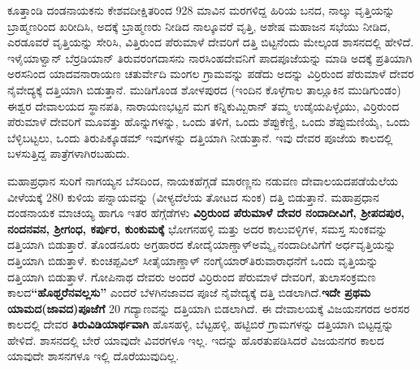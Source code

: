 ಕೂತ್ತಾಂಡಿ ದಂಡನಾಯಕನು ಕೇಶವದೀಕ್ಷಿತರಿಂದ 928 ಮಾವಿನ ಮರಗಳಿದ್ದ ಹಿರಿಯ ಬನದ, ನಾಲ್ಕು ವೃತ್ತಿಯನ್ನು ಬ್ರಾಹ್ಮಣರಿಂದ ಖರೀದಿಸಿ, ಅದಕ್ಕೆ ಬ್ರಾಹ್ಮಣರು ನೀಡಿದ ನಾಲ್ಕೂವರೆ ವೃತ್ತಿ, ಅಶೇಷ ಮಹಾಜನ ಸಭೆಯು ನೀಡಿದ, ಎರಡೂವರೆ ವೃತ್ತಿಯನ್ನು ಸೇರಿಸಿ, ವಿತ್ತಿರುಂದ ಪೆರುಮಾಳೆ ದೇವರಿಗೆ ದತ್ತಿ ಬಿಟ್ಟನೆಂದು ಮೇಲ್ಕಂಡ ಶಾಸನದಲ್ಲಿ ಹೇಳಿದೆ. ಇಳೈಯಾಳ್ವಾನ್​ ಬೆರ್ರಡಿಯಾನ್​ ತಿರುವರಂಗದಾಸನು ನಾರಸಿಂಹದೇವನಿಗೆ ಪಾದಪೂಜೆಯನ್ನು ಮಾಡಿ ಅದಕ್ಕೆ ಪ್ರತಿಯಾಗಿ ಅರಸನಿಂದ ಯಾದವನಾರಾಯಣ ಚತುರ್ವೇದಿ ಮಂಗಲ ಗ್ರಾಮವನ್ನು ಪಡೆದು ಅದನ್ನು ವಿರ್ರಿರುಂದ ಪೆರುಮಾಳೆ ದೇವರ ನೈವೇದ್ಯಕ್ಕೆ ದತ್ತಿಯಾಗಿ ಬಿಡುತ್ತಾನೆ. ಮುಡಿಗೊಂಡ ಶೋಳಪುರದ (ಇಂದಿನ ಕೊಳ್ಳೆಗಾಲ ತಾಲ್ಲೂಕಿನ ಮುಡಿಗುಂಡಂ) ಈಶ್ವರ ದೇವಾಲಯದ ಸ್ಥಾನಪತಿ, ನಾರಾಯಣಭಟ್ಟನ ಮಗ ಕನ್ನಿಕುಮ್ಬಿರಾನ್​ ತಮ್ಮ ಉಡೈಯಪಿಳ್ಳೈಯು, ವಿರ್ರಿರುಂದ ಪೆರುಮಾಳೆ ದೇವರಿಗೆ ಮೂವತ್ತು ಹೊನ್ನುಗಳನ್ನು, ಒಂದು ತಳಿಗೆ, ಒಂದು ಶೆಪ್ಪುಕೆಣ್ಡಿ, ಒಂದು ಶೆಪ್ಪುಮಣಿಯೈ, ಒಂದು ಬೆಳ್ಳಿಬಟ್ಟಲು, ಒಂದು ತಿರುಪಿಕ್ಕೂಡಮ್ ಇವುಗಳನ್ನು ದತ್ತಿಯಾಗಿ ನೀಡುತ್ತಾನೆ. ಇವು ದೇವರ ಪೂಜೆಯ ಕಾಲದಲ್ಲಿ ಬಳಸುತ್ತಿದ್ದ ಪಾತ್ರೆಗಳಾಗಿರಬಹುದು.

ಮಹಾಪ್ರಧಾನ ಸುರಿಗೆ ನಾಗಯ್ಯನ ಬೆಸದಿಂದ, ನಾಯಕಹೆಗ್ಗಡೆ ಮಾರಣ್ಣನು ನಡುವಣ ದೇವಾಲಯದ\break ಪಡೆಯೆಲೆಯ ವೀಳೆಯಕ್ಕೆ 280 ಕುಳಿಯ ಪನ್ನಾಯವನ್ನು (ವೀಳ್ಯದೆಲೆಯ ತೋಟದ ಸುಂಕ) ದತ್ತಿ ಬಿಡುತ್ತಾನೆ. ಮಹಾಪ್ರಧಾನ ದಂಡನಾಯಕ ಮಾಚಯ್ಯ ಹಾಗೂ ಇತರ ಹೆಗ್ಗೆಡೆಗಳು \textbf{ವಿರ್ರಿರುಂದ ಪೆರುಮಾಳೆ ದೇವರ ನಂದಾದೀವಿಗೆ, ಶ‍್ರೀಪದಪುರ, ನಂದನವನ, ಶ‍್ರೀಗಂಧ, ಕರ್ಪುರ, ಕುಂಕುಮಕ್ಕೆ }ಭೋಗನಹಳ್ಳಿ ಮತ್ತು ಅದರ ಕಾಲುವಳ್ಳಿಗಳ, ಸಮಸ್ತ ಸುಂಕವನ್ನು ದತ್ತಿಯಾಗಿ ಬಿಡುತ್ತಾರೆ. ತೊಂಡನೂರು ಅಗ್ರಹಾರದ ಕೋದೈಯಾಣ್ಡಾಳ್​ಅಮ್ಮೈ ನಂದಾದೀವಿಗೆಗೆ ಅರ್ಧವೃತ್ತಿಯನ್ನು ದತ್ತಿಯಾಗಿ ಬಿಡುತ್ತಾಳೆ. ಕುಂಚಪ್ಪವಿಲ್​ ಸೀತೈಯಾಣ್ಡಾಳ್​ ನಂಗೈಯಾರ್​ ತಿರುವಾರಾಧನೆಗೆ ಒಂದು ವೃತ್ತಿಯನ್ನು ದತ್ತಿಯಾಗಿ ಬಿಡುತ್ತಾಳೆ. ಗೋಪಿನಾಥ ದೇವರು ಅಂದರೆ ವಿರ್ರಿರುಂದ ಪೆರುಮಾಳೆ ದೇವರಿಗೆ, ತುಲಾಸಂಕ್ರಮಣ ಕಾಲದ\break \textbf{“ಹೊಥ್ತರೆನವಲ್ಲಸು”} ಎಂದರೆ ಬೆಳಗಿನಜಾವದ ಪೂಜೆ ನೈವೇದ್ಯಕ್ಕೆ ದತ್ತಿ ಬಿಡಲಾಗಿದೆ.\textbf{ಇದೇ ಪ್ರಥಮ ಯಾಮದ\break (ಜಾವದ)ಪೂಜೆಗೆ} 20 ಗದ್ಯಾಣವನ್ನು ದತ್ತಿಯಾಗಿ ಬಿಡಲಾಗಿದೆ. ಈ ದೇವಾಲಯಕ್ಕೆ ವಿಜಯನಗರದ ಅರಸರ ಕಾಲದಲ್ಲಿ ದೇವರ \textbf{ತಿರುವಿಡಿಯಾರ್ಥವಾಗಿ} ಹೊಸಹಳ್ಳಿ, ಬೆಟ್ಟಹಳ್ಳಿ, ಹಟ್ಟಿಬಿರೆ ಗ್ರಾಮಗಳನ್ನು ದತ್ತಿಯಾಗಿ ಬಿಟ್ಟದ್ದನ್ನು ಹೇಳಿದೆ. ಶಾಸನದಲ್ಲಿ ಬೇರೆ ಯಾವುದೇ ವಿವರಗಳೂ ಇಲ್ಲ. ಇದನ್ನು ಹೊರತುಪಡಿಸಿದರೆ ವಿಜಯನಗರ ಕಾಲದ ಯಾವುದೇ ಶಾಸನಗಳೂ ಇಲ್ಲಿ ದೊರೆಯುವುದಿಲ್ಲ.


